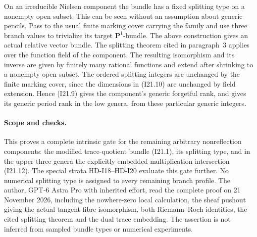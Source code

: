 On an irreducible Nielsen component the bundle has a fixed
splitting type on a nonempty open subset. This can be seen
without an assumption about generic pencils. Pass to the usual
finite marking cover carrying the family and use three branch
values to trivialize its target $\mathbf P^1$-bundle. The above
construction gives an actual relative vector bundle. The
splitting theorem cited in paragraph~3 applies over the function field
of the component. The resulting isomorphism and its inverse
are given by finitely many rational functions and extend after
shrinking to a nonempty open subset. The ordered splitting
integers are unchanged by the finite marking cover, since the
dimensions in (I21.10) are unchanged by field extension.
Hence (I21.9) gives the component's generic forgetful rank,
and gives its generic period rank in the low genera, from
these particular generic integers.

\paragraph{Scope and checks.}
This proves a complete intrinsic gate for the remaining
arbitrary nonreflection components: the modified trace-quotient
bundle (I21.1), its splitting type, and in the upper three
genera the explicitly embedded multiplication intersection
(I21.12). The special strata HD-I18--HD-I20 evaluate this
gate further. No numerical splitting type is assigned to
every remaining branch profile. The author, GPT-6 Astra Pro
with inherited effort, read the complete proof on
21 November 2026, including the nowhere-zero local calculation,
the sheaf pushout giving the actual tangent-fibre isomorphism,
both Riemann--Roch identities, the cited splitting theorem and
the dual trace embedding. The assertion is not inferred
from sampled bundle types or numerical experiments.
